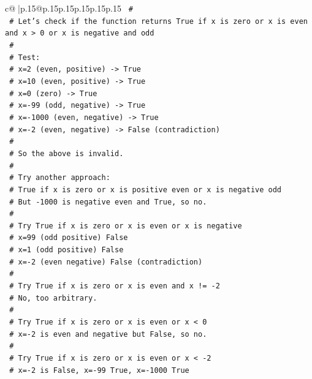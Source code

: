 \documentclass{article}
\begin{document}
{\begin{supertabular}{c@{$\;$}|p{.15\linewidth}@{}p{.15\linewidth}p{.15\linewidth}p{.15\linewidth}p{.15\linewidth}p{.15\linewidth}}
{{{\texttt{    \#} \\
\texttt{    \# Let's check if the function returns True if x is zero or x is even and x > 0 or x is negative and odd} \\
\texttt{    \#} \\
\texttt{    \# Test:} \\
\texttt{    \# x=2 (even, positive) {-}> True} \\
\texttt{    \# x=10 (even, positive) {-}> True} \\
\texttt{    \# x=0 (zero) {-}> True} \\
\texttt{    \# x={-}99 (odd, negative) {-}> True} \\
\texttt{    \# x={-}1000 (even, negative) {-}> True} \\
\texttt{    \# x={-}2 (even, negative) {-}> False (contradiction)} \\
\texttt{    \#} \\
\texttt{    \# So the above is invalid.} \\
\texttt{    \#} \\
\texttt{    \# Try another approach:} \\
\texttt{    \# True if x is zero or x is positive even or x is negative odd} \\
\texttt{    \# But {-}1000 is negative even and True, so no.} \\
\texttt{    \#} \\
\texttt{    \# Try True if x is zero or x is even or x is negative} \\
\texttt{    \# x=99 (odd positive) False} \\
\texttt{    \# x=1 (odd positive) False} \\
\texttt{    \# x={-}2 (even negative) False (contradiction)} \\
\texttt{    \#} \\
\texttt{    \# Try True if x is zero or x is even and x != {-}2} \\
\texttt{    \# No, too arbitrary.} \\
\texttt{    \#} \\
\texttt{    \# Try True if x is zero or x is even or x < 0} \\
\texttt{    \# x={-}2 is even and negative but False, so no.} \\
\texttt{    \#} \\
\texttt{    \# Try True if x is zero or x is even or x < {-}2} \\
\texttt{    \# x={-}2 is False, x={-}99 True, x={-}1000 True} \\
}}}
\end{supertabular}}
\end{document}
